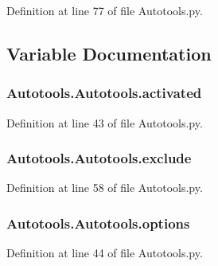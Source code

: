 Definition at line 77 of file Autotools.\-py.



\subsection{Variable Documentation}
\hypertarget{group___tools_ga6bbb714a91bc8b6fe749326772b073b3}{
\subsubsection[{activated}]{\setlength{\rightskip}{0pt plus 5cm}Autotools.\-Autotools.\-activated}}\label{group___tools_ga6bbb714a91bc8b6fe749326772b073b3}


Definition at line 43 of file Autotools.\-py.

\hypertarget{group___tools_gaee37d9789ea22ee310ebc357cd721b7f}{
\subsubsection[{exclude}]{\setlength{\rightskip}{0pt plus 5cm}Autotools.\-Autotools.\-exclude}}\label{group___tools_gaee37d9789ea22ee310ebc357cd721b7f}


Definition at line 58 of file Autotools.\-py.

\hypertarget{group___tools_ga8b348e19f0a7104bde9c43c3a6ed695d}{
\subsubsection[{options}]{\setlength{\rightskip}{0pt plus 5cm}Autotools.\-Autotools.\-options}}\label{group___tools_ga8b348e19f0a7104bde9c43c3a6ed695d}


Definition at line 44 of file Autotools.\-py.

